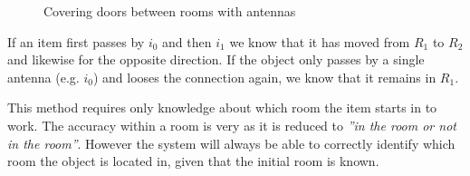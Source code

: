 \begin{figure}[h]
\centering

\caption{Covering doors between rooms with antennas}
\label{rooms:fig:rooms}
\end{figure}

If an item first passes by $i_0$ and then $i_1$ we know that it has moved from $R_1$ to $R_2$ and likewise for the opposite direction.
If the object only passes by a single antenna (e.g. $i_0$) and looses the connection again, we know that it remains in $R_1$.

This method requires only knowledge about which room the item starts in to work.
The accuracy within a room is very as it is reduced to \textit{''in the room or not in the room''}.
However the system will always be able to correctly identify which room the object is located in, given that the initial room is known.